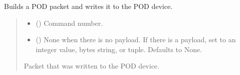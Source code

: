 \documentclass[letterpaper,10pt,english]{sphinxmanual}
\begin{document}
\begin{fulllineitems}
\begin{fulllineitems}
\label{\detokenize{Morelia.Devices:Morelia.Devices.BasicPodProtocol.Pod.WritePacket}}
\pysigstartsignatures
{}
\pysigstopsignatures
\sphinxAtStartPar
Builds a POD packet and writes it to the POD device.
\begin{quote}\begin{description}
\begin{itemize}
\item {} 
\sphinxAtStartPar
{} (\sphinxstyleliteralemphasis{\sphinxupquote{ | }}) \textendash{} Command number.

\item {} 
\sphinxAtStartPar
{} (\sphinxstyleliteralemphasis{\sphinxupquote{ | }}\sphinxstyleliteralemphasis{\sphinxupquote{ | }}\sphinxstyleliteralemphasis{\sphinxupquote{{[}}}\sphinxstyleliteralemphasis{\sphinxupquote{ | }}\sphinxstyleliteralemphasis{\sphinxupquote{{]}}}\sphinxstyleliteralemphasis{\sphinxupquote{, }}) \textendash{} None when there is no payload. If there                 is a payload, set to an integer value, bytes string, or tuple. Defaults to None.

\end{itemize}

\sphinxAtStartPar
Packet that was written to the POD device.


\end{description}
\end{quote}
\end{fulllineitems}
\end{fulllineitems}
\end{document}
